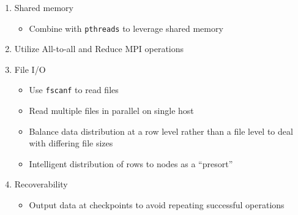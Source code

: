 \documentclass{article}
\begin{document}
\begin{enumerate}
    \item Shared memory
        \begin{itemize}
            \item Combine with \texttt{pthreads} to leverage shared memory
        \end{itemize}
    \item Utilize All-to-all and Reduce MPI operations
    \item File I/O
        \begin{itemize}
            \item Use \texttt{fscanf} to read files
            \item Read multiple files in parallel on single host
            \item Balance data distribution at a row level rather than a file level to deal with differing file sizes
            \item Intelligent distribution of rows to nodes as a ``presort''
        \end{itemize}
    \item Recoverability
        \begin{itemize}
            \item Output data at checkpoints to avoid repeating successful operations
        \end{itemize}
\end{enumerate}


\end{document}
